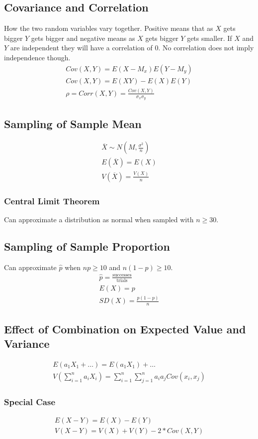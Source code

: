 \subsection{Covariance and Correlation}
How the two random variables vary together. Positive means that as $X$ gets bigger $Y$ gets bigger and negative means as $X$ gets bigger $Y$ gets smaller. If $X$ and $Y$ are independent they will have a correlation of $0$. No correlation does not imply independence though. 
\begin{align}
  Cov(X, Y) = E(X - M_x)E(Y - M_y) \\
  Cov(X, Y) = E(XY) - E(X)E(Y) \\
  \rho = Corr(X, Y) = \frac{Cov(X, Y)}{\sigma_x\sigma_y}
\end{align}

\subsection{Sampling of Sample Mean}
\begin{align}
  \overbar{X} \sim N(M, \frac{\sigma^2}{n}) \\
  E(\overbar{X}) = E(X) \\
  V(\overbar{X}) = \frac{V(X)}{n}
\end{align}

\subsubsection{Central Limit Theorem}
Can approximate a distribution as normal when sampled with $n \geq 30$.

\subsection{Sampling of Sample Proportion}
Can approximate $\hat{p}$ when $np \geq 10$ and $n(1 - p) \geq 10$.
\begin{align}
  \hat{p} = \frac{\text{successes}}{\text{trials}} \\
  E(X) = p \\
  SD(X) = \frac{p(1-p)}{n}
\end{align}

\subsection{Effect of Combination on Expected Value and Variance}
\begin{align}
  E(a_1X_1 + \ldots) = E(a_1X_1) + \ldots \\
  V(\sum_{i=1}^{n} a_iX_i) = \sum_{i=1}^{n} \sum_{j=1}^{n} a_ia_jCov(x_i, x_j)
\end{align}

\subsubsection{Special Case}
\begin{align}
  E(X - Y) = E(X) - E(Y) \\
  V(X - Y) = V(X) + V(Y) - 2 * Cov(X, Y)
\end{align}
